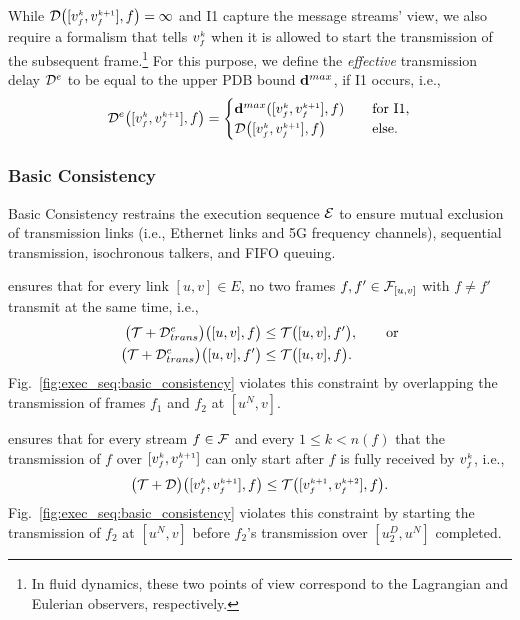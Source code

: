 While $\D{[\v{k}{f}, \v{k+1}{f}],f} = \infty$ and I1 capture the message streams' view, we also require a formalism that tells $\v{k}{f}$ when it is allowed to start the transmission of the subsequent frame.\footnote{In fluid dynamics, these two points of view correspond to the Lagrangian and Eulerian observers, respectively.}
For this purpose, we define the \textit{effective} transmission delay $\eD{}$ to be equal to the upper PDB bound $\dpdbmax{}$, if I1 occurs, i.e.,
\begin{equation}\label{eq:eD}
  \eD{[\v{k}{f}, \v{k+1}{f}],f} = \begin{cases}
    \dpdbmax{[\v{k}{f}, \v{k+1}{f}],f} \quad &\text{for } \text{I1}, \\
    \D{[\v{k}{f}, \v{k+1}{f}],f} \quad &\text{else.}
    \end{cases}
\end{equation}


\subsubsection{Basic Consistency} \label{sec:execution_sequences:basic_consistency}
Basic Consistency restrains the execution sequence $\E$ to ensure mutual exclusion of transmission links (i.e., Ethernet links and 5G frequency channels), sequential transmission, isochronous talkers, and FIFO queuing.

\textbf{\TC} \label{sec:execution_sequences:basic_consistency:tc}
ensures that for every link $[u,v] \in E$, no two frames $f, f' \in \TT_{[u,v]}$ with $f \neq f'$ transmit at the same time, i.e.,
\begin{align*}
  \add{\T}{\eDtrans}{[u,v], f} &\leq \T{[u,v], f'}, \qquad \text{or}\\
  \add{\T}{\eDtrans}{[u,v], f'} &\leq \T{[u,v], f}.
\end{align*}
Fig.~\ref{fig:exec_seq:basic_consistency} violates this constraint by overlapping the transmission of frames $f_1$ and $f_2$ at $[u^N, v]$.

\textbf{\ST} \label{sec:execution_sequences:basic_consistency:st}
ensures that for every stream $f \in \TT$ and every $1 \leq k < n(f)$ that the transmission of $f$ over $[\v{k}{f}, \v{k+1}{f}]$ can only start after $f$ is fully received by $\v{k}{f}$, i.e.,
\begin{equation*}
  \add{\T}{\D}{[\v{k}{f}, \v{k+1}{f}], f} \leq \T{[\v{k+1}{f}, \v{k+2}{f}], f}.
\end{equation*}
Fig.~\ref{fig:exec_seq:basic_consistency} violates this constraint by starting the transmission of $f_2$ at $[u^N, v]$ before $f_2$'s transmission over $[u^D_2, u^N]$ completed.

